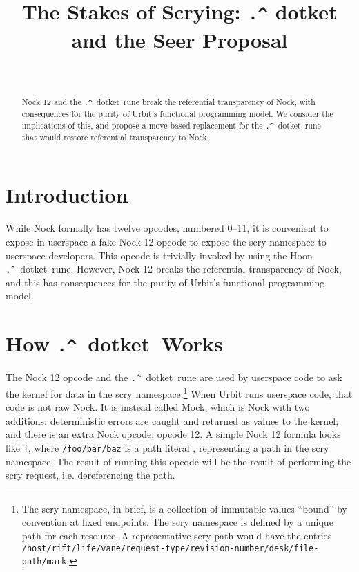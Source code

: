 \documentclass[twoside]{article}
\title{The Stakes of Scrying:  \texttt{\string.\string^} dotket and the Seer Proposal}
\author{\authorname~\authorpatp \\ \affiliation}
\date{}
\newcommand{\dotket}{\texttt{\string.\string^}~dotket}
\begin{document}
\maketitle
\thispagestyle{firststyle}

\begin{abstract}
Nock 12 and the \dotket~rune break the referential transparency of Nock, with consequences for the purity of Urbit's functional programming model.  We consider the implications of this, and propose a move-based replacement for the \dotket~rune that would restore referential transparency to Nock.
\end{abstract}

\setcounter{page}{1}

\tableofcontents

\section{Introduction}

While Nock formally has twelve opcodes, numbered 0--11, it is convenient to expose in userspace a fake Nock 12 opcode to expose the scry namespace to userspace developers.  This opcode is trivially invoked by using the Hoon \dotket~rune.  However, Nock 12 breaks the referential transparency of Nock, and this has consequences for the purity of Urbit's functional programming model.

\section[How dotket Works]{How \dotket~Works}

The Nock 12 opcode and the \dotket~rune are used by userspace code to ask the kernel for data in the scry namespace.\footnote{The scry namespace, in brief, is a collection of immutable values “bound” by convention at fixed endpoints.  The scry namespace is defined by a unique path for each resource.  A representative scry path would have the entries \texttt{/host/rift/life/vane/request-type/revision-number/desk/file-path/mark}.}  When Urbit runs userspace code, that code is not raw Nock.  It is instead called Mock, which is Nock with two additions:   deterministic errors are caught and returned as values to the kernel; and there is an extra Nock opcode, opcode 12.  A simple Nock 12 formula looks like \texttt{\string[12 \string[1 /foo/bar/baz\string]\string]}, where \texttt{/foo/bar/baz} is a path literal \texttt{}, representing a path in the scry namespace.  The result of running this opcode will be the result of performing the scry request, i.e. dereferencing the path.
\end{document}
